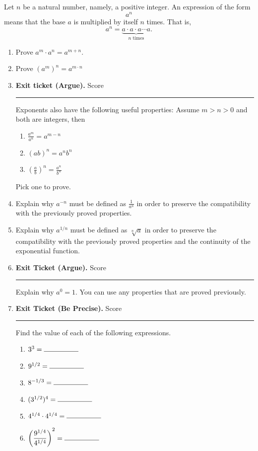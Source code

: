 \documentclass[twoside, 10pt]{article}
\begin{document}
Let $n$ be a natural number, namely, a positive integer.
An expression of the form
\[
a^n
\]
means that the base $a$ is multiplied by itself $n$ times. That is,
\[
a^n = \underbrace{a \cdot a \cdot a \cdots a}_{n \text{ times}}.
\]
\begin{enumerate}[label=\arabic*.]
\item Prove $a^m \cdot a^n = a^{m + n}$.
\item Prove $(a^m)^n  = a^{m\cdot n}$
\clearpage
\item {\bf Exit ticket (Argue).}  Score \rule{4em}{0.4pt}

Exponents also have the following useful properties: Assume $m > n > 0$ and both are integers, then
\begin{enumerate}
\item
 $\displaystyle \frac{a^m}{a^n} = a^{m - n}$
 \item
 $(ab)^n = a^nb^n$
 \item
 $\displaystyle \left(\frac{a}{b}\right)^n =\frac{a^n}{b^n} $
\end{enumerate}
    Pick one to prove.
\clearpage

\item
Explain why $a^{-n}$ must be defined as $\displaystyle \frac{1}{a^n}$ in order to preserve the compatibility with the previously proved properties.

\item 
Explain why $a^{1/n}$ must be defined as $\displaystyle \sqrt[n]{a}$ in order to preserve the compatibility with the previously proved properties and the continuity of the exponential function. 
\clearpage

\item {\bf Exit Ticket (Argue).} Score \rule{4em}{.4pt}

Explain why $a^0 = 1$. You can use any properties that are proved previously.

\item {\bf Exit Ticket (Be Precise).} Score \rule{4em}{.4pt}

Find the value of each of the following expressions.
\begin{enumerate}[itemsep=2em]
\item
$3^3 = \rule{5em}{0.4pt}$
\item 
$9^{1/2} = \rule{5em}{0.4pt}$
\item 
$8^{-1/3} = \rule{5em}{0.4pt}$
\item
$(3^{1/2})^4 = \rule{5em}{0.4pt}$
\item 
$4^{1/4}\cdot4^{1/4} = \rule{5em}{0.4pt}$
\item
$\displaystyle\left(\frac{9^{1/4}}{4^{1/4}}\right)^2 = \rule{5em}{0.4pt}$
\end{enumerate}
\clearpage


\end{enumerate}
\end{document}
